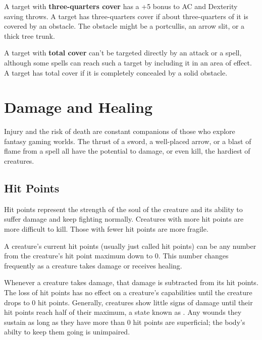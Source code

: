 A target with \textbf{three-quarters cover} has a +5 bonus to AC and Dexterity saving throws. A target has three-quarters cover if about three-quarters of it is covered by an obstacle. The obstacle might be a portcullis, an arrow slit, or a thick tree trunk.

A target with \textbf{total cover} can't be targeted directly by an attack or a spell, although some spells can reach such a target by including it in an area of effect. A target has total cover if it is completely concealed by a solid obstacle.

\section{Damage and Healing}

Injury and the risk of death are constant companions of those who explore fantasy gaming worlds. The thrust of a sword, a well-placed arrow, or a blast of flame from a  spell all have the potential to damage, or even kill, the hardiest of creatures.

\subsection{Hit Points}

Hit points represent the strength of the soul of the creature and its ability to suffer damage and keep fighting normally. Creatures with more hit points are more difficult to kill. Those with fewer hit points are more fragile.

A creature's current hit points (usually just called hit points) can be any number from the creature's hit point maximum down to 0. This number changes frequently as a creature takes damage or receives healing.

Whenever a creature takes damage, that damage is subtracted from its hit points. The loss of hit points has no effect on a creature's capabilities until the creature drops to 0 hit points. Generally, creatures show little signs of damage until their hit points reach half of their maximum, a state known as . Any wounds they sustain as long as they have more than 0 hit points are superficial; the body's abilty to keep them going is unimpaired.

